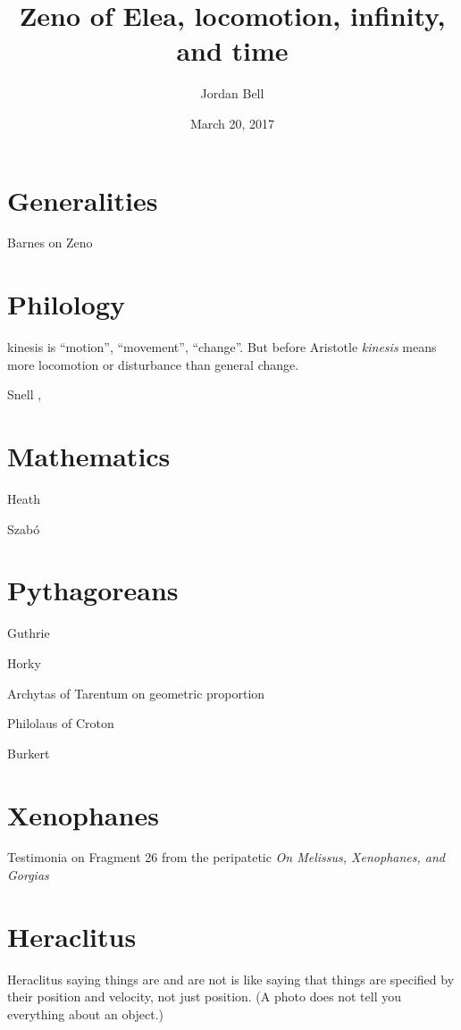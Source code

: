 \documentclass{article}
\begin{document}
\title{Zeno of Elea, locomotion, infinity, and time}
\author{Jordan Bell}
\date{March 20, 2017}

\maketitle

\section{Generalities}
Barnes \cite{barnes} on Zeno


\section{Philology}
\textrm{kinesis} is ``motion'', ``movement'', ``change''. But before Aristotle {\em kinesis} means more locomotion or
disturbance
than general change.

Snell \cite[p.~217, chapter 9]{snell}, \cite[pp.~241--244, chapter 10]{snell}


\section{Mathematics}
Heath \cite[pp.~271--283]{HGMI}

Szab\'o \cite{szabo}


\section{Pythagoreans}
Guthrie \cite{sylvanguthrie}

Horky \cite{horky}

Archytas of Tarentum on geometric proportion \cite{archytas}

Philolaus of Croton \cite{philolaus}

Burkert \cite[pp.~285--288]{burkert}

\section{Xenophanes}
Testimonia on Fragment 26 from the peripatetic {\em On Melissus, Xenophanes, and Gorgias} \cite[pp.~204--210]{xenophanes}


\section{Heraclitus}
Heraclitus saying things are and are not is like saying that things are specified by their position and velocity, not just position. (A photo does not tell you everything about an object.)
\end{document}
